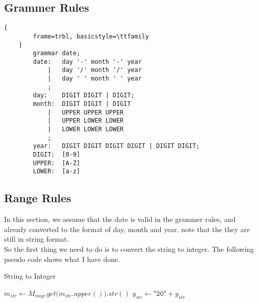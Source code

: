 \documentclass[a4paper,12pt]{article} %
\begin{document}
\newpage

\subsection*{Grammer Rules}

\begin{lstlisting}[
        frame=trbl, basicstyle=\ttfamily
    ]
        grammar date;
        date:   day '-' month '-' year
            |   day '/' month '/' year
            |   day ' ' month ' ' year
            ;
        day:    DIGIT DIGIT | DIGIT;
        month:  DIGIT DIGIT | DIGIT 
            |   UPPER UPPER UPPER 
            |   UPPER LOWER LOWER 
            |   LOWER LOWER LOWER
            ;
        year:   DIGIT DIGIT DIGIT DIGIT | DIGIT DIGIT;
        DIGIT:  [0-9]
        UPPER:  [A-Z]
        LOWER:  [a-z]
\end{lstlisting}

\subsection*{Range Rules}

In this section, we assume that the date is valid in the grammer rules, 
and already converted to the format of day, month and year, 
note that the they are still in string format.
\\
So the first thing we need to do is to convert the string to integer. 
The following pseudo code shows what I have done.

\begin{algorithm}
	\caption{String to Integer}
	\SetAlgoLined
     {
         {
        }
        $m_{str} \gets M_{map}.{get(}m_{str}.{upper())}.{str()}$ 
    }
     {
         {
            $y_{str} \gets \texttt{"20"} + y_{str}$
        } 
    }
    
\end{algorithm}
\end{document}
